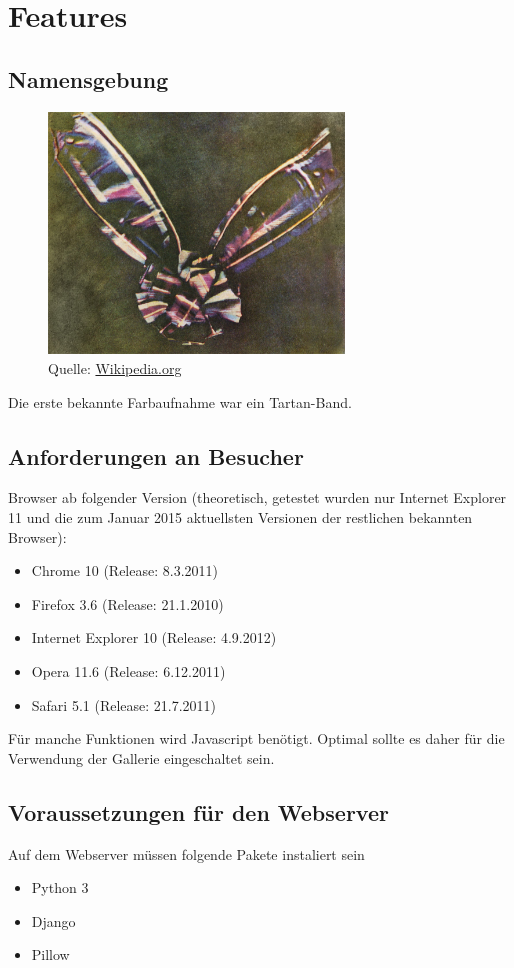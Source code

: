 \chapter{Features}

\section{Namensgebung}
\begin{figure}[h]
  \centering
  \includegraphics[width=0.7\textwidth]{images/tartan_band.jpg}
  \caption{Quelle: \url{Wikipedia.org}}
\end{figure}
Die erste bekannte Farbaufnahme war ein Tartan-Band.

\section{Anforderungen an Besucher}\label{besAnforderungen}
Browser ab folgender Version (theoretisch, getestet wurden nur Internet Explorer 11 und die zum Januar 2015 aktuellsten Versionen der restlichen bekannten Browser):
\begin{itemize}
	\item Chrome 10 (Release: 8.3.2011)
	\item Firefox 3.6 (Release: 21.1.2010)
	\item Internet Explorer 10 (Release: 4.9.2012)
	\item Opera 11.6 (Release: 6.12.2011)
	\item Safari 5.1 (Release: 21.7.2011)
\end{itemize}

Für manche Funktionen wird Javascript benötigt. Optimal sollte es daher für die Verwendung der Gallerie eingeschaltet sein.

\section{Voraussetzungen für den Webserver}
Auf dem Webserver müssen folgende Pakete instaliert sein
\begin{itemize}
	\item Python 3
	\item Django
	\item Pillow
\end{itemize}